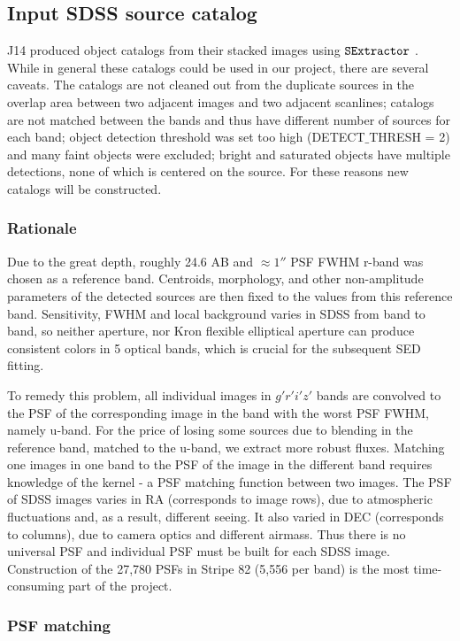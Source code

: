 \documentclass[apj,iop]{emulateapj}
\begin{document}
\subsection{Input SDSS source catalog} 
J14 produced object catalogs from their stacked images using $\tt SExtractor$ \citep[][]{Bertin1996}. While in general these catalogs could be used in our project, there are several caveats. The catalogs are not cleaned out from the duplicate sources in the overlap area between two adjacent images and two adjacent scanlines; catalogs are not matched between the bands and thus have different number of sources for each band; object detection threshold was set too high (DETECT$\_$THRESH = 2) and many faint objects were excluded; bright and saturated objects have multiple detections, none of which is centered on the source. For these reasons new catalogs will be constructed.

\subsubsection{Rationale}
Due to the great depth, roughly 24.6 AB and $\approx1''$ PSF FWHM r-band was chosen as a reference band. Centroids, morphology, and other non-amplitude parameters of the detected sources are then fixed to the values from this reference band. Sensitivity, FWHM and local background varies in SDSS from band to band, so neither aperture, nor Kron flexible elliptical aperture \citep{Kron1980} can produce consistent colors in 5 optical bands, which is crucial for the subsequent SED fitting.

To remedy this problem, all individual images in $g'r'i'z'$ bands are convolved to the PSF of the corresponding image in the band with the worst PSF FWHM, namely u-band. For the price of losing some sources due to blending in the reference band, matched to the u-band, we extract more robust fluxes. Matching one images in one band to the PSF of the image in the different band requires knowledge of the kernel - a PSF matching function between two images. The PSF of SDSS images varies in RA (corresponds to image rows), due to atmospheric fluctuations and, as a result, different seeing. It also varied in DEC (corresponds to columns), due to camera optics and different airmass. Thus there is no universal PSF and individual PSF must be built for each SDSS image. Construction of the 27,780 PSFs in Stripe 82 (5,556 per band) is the most time-consuming part of the project.

\subsubsection{PSF matching}
\end{document}
